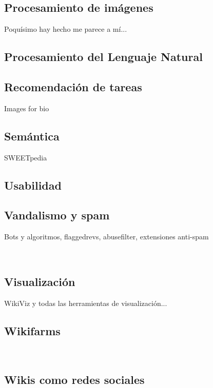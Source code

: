 \documentclass[11pt,onecolumn]{article}
\begin{document}
\subsection{Procesamiento de imágenes}

Poquísimo hay hecho me parece a mí...

\subsection{Procesamiento del Lenguaje Natural}


\subsection{Recomendación de tareas}

Images for bio

\subsection{Semántica}

SWEETpedia

\subsection{Usabilidad}

\subsection{Vandalismo y spam}

Bots y algoritmos, flaggedrevs, abusefilter, extensiones anti-spam

~\citep{avbot2011}
~\citep{avbot2010}
~\citep{avbot2009}

\subsection{Visualización}

WikiViz y todas las herramientas de visualización...


\subsection{Wikifarms}

~\citep{kittur2010}

\subsection{Wikis como redes sociales}
\end{document}
